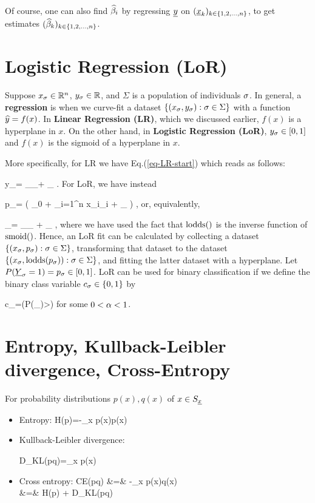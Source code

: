 Of course, one can also
find $\widehat{\beta}_i$
by regressing ${\underline{y}}$
on $({\underline{x}}_k)_{k\in \{1,2,
\ldots, n\}}$, to get
estimates
$(\widehat{\beta}_k)_{k\in \{1,2,
\ldots, n\}}$.

\section{Logistic Regression (LoR)}

Suppose
$x_\sigma\in { \mathbb{R}}^n$,
$y_\sigma\in { \mathbb{R}}$,
and $\Sigma$
is a population
of individuals $\sigma$.
In general,
a {\bf regression}
is when
we curve-fit a dataset
$\{(x_\sigma, y_\sigma):\sigma\in\Sigma\}$
with a function
${\widehat{y}}=f(x)$.
In {\bf Linear
Regression (LR)},
which we
discussed earlier,
$f(x)$ is a hyperplane
in $x$.
On the other hand,
in {\bf Logistic Regression (LoR)},
$y_\sigma\in[0,1]$ and
$f(x)$ is the sigmoid of
a hyperplane in $x$.



More specifically, for LR
we have
Eq.(\ref{eq-LR-start})
which reads as follows:

\beq
y_\s=
_{\haty_\s}+ \eps_\s
\quad{}\;.
\eeq
For LoR, we have instead

\beq
p_\s=
\smoid\left(
\beta_0 +
\sum_{i=1}^{n} x_{\s i}\beta_{i} + \eps_\s
\right)
\quad{}\;,
\eeq
or, equivalently,


\beq
{}
_{\ln {}}=
_{\haty_\s} + \eps_\s
\quad{}\;,
\eeq
where we have used the fact that
${\rm lodds}()$
is the inverse function of ${\rm smoid}()$.
Hence, an LoR
fit can be calculated by
collecting a dataset
$\{(x_\sigma, p_\sigma):\sigma\in\Sigma\}$,
transforming that
dataset to the dataset
$\{(x_\sigma,{\rm lodds}( p_\sigma)):\sigma\in\Sigma\}$,
and fitting the latter dataset
with a hyperplane.
Let $P({\underline{Y}}_\sigma=1)=p_\sigma\in [0,1]$.
LoR can be used
for binary
classification
if we define the
binary class
variable $c_\sigma\in \{0,1\}$ by

\beq
c_\s =\indi(P(\rvY_)>\alp)
\eeq
for some $0<\alpha<1$.



\section{Entropy,
 Kullback-Leibler divergence, Cross-Entropy}

For probability distributions $p(x), q(x)$ of $x\in S_{\underline{x}}$
\begin{itemize}
\item
Entropy:
\beq
H(p)=-\sum_x p(x)\ln p(x)
\eeq

\item
Kullback-Leibler divergence:

\beq
D_{KL}(p\parallel q)=\sum_{x} p(x)\ln {}
\eeq
\item
Cross entropy:
\beqa
CE(p\parallel q) &=& -\sum_x p(x)\ln q(x)\\
&=& H(p) + D_{KL}(p\parallel q)
\eeqa
\end{itemize}

